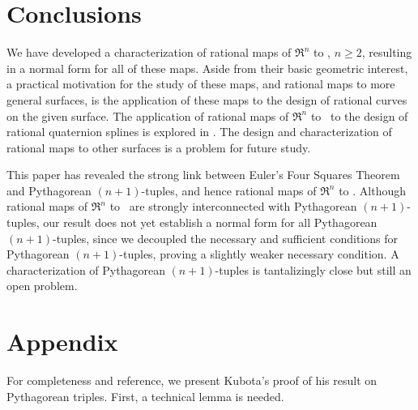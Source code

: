 \section{Conclusions}
\label{sec:conclusions}

We have developed a characterization of
rational maps of $\Re^n$ to , $n \geq 2$,
resulting in a normal form for all of these maps.
Aside from their basic geometric interest,
a practical motivation for the study of these maps, and rational maps to more
general surfaces, is the application of these maps to the design of
rational curves on the given surface.
The application of rational maps of $\Re^n$ to \ to the
design of rational quaternion splines is explored in \cite{jj95,jj+jimbo99}.
The design and characterization of rational maps to other surfaces
is a problem for future study.

%

This paper has revealed the strong link between
Euler's Four Squares Theorem and Pythagorean $(n+1)$-tuples,
and hence rational maps of $\Re^n$ to .
Although rational maps of $\Re^n$ to \ are strongly interconnected
with Pythagorean $(n+1)$-tuples,
our result does not yet establish a normal form for all
Pythagorean $(n+1)$-tuples,
since we decoupled the necessary and sufficient conditions for
Pythagorean $(n+1)$-tuples,
proving a slightly weaker necessary condition.
A characterization of Pythagorean $(n+1)$-tuples
is tantalizingly close but still an open problem.

\section{Appendix}

For completeness and reference,
we present Kubota's proof of his result on Pythagorean triples.
First, a technical lemma is needed.

